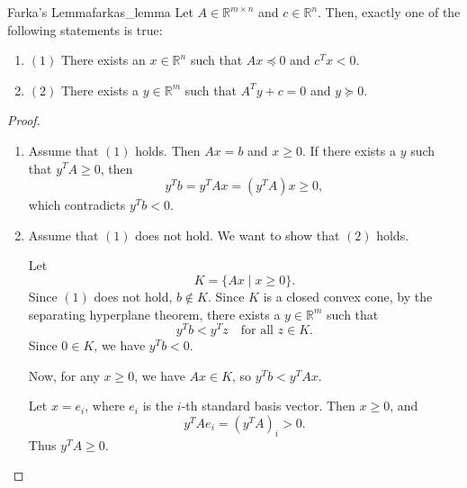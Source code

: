 \begin{lemma}{Farka's Lemma}{farkas_lemma}
	Let \(A \in \mathbb{R}^{m \times n}\) and \(c \in \mathbb{R}^n\). Then, exactly one of the following statements is true:
	\begin{enumerate}
		\item[] \((1)\) There exists an \(x \in \mathbb{R}^n\) such that \(Ax \preceq 0\) and \(c^T x < 0\).
		\item[] \((2)\) There exists a \(y \in \mathbb{R}^m\) such that \(A^T y + c = 0\) and \(y \succeq 0\).
	\end{enumerate}
\end{lemma}

\begin{proof}
	\begin{enumerate}
		\item[] Assume that \((1)\) holds. Then \(Ax = b\) and \(x \ge 0\). If there exists a \(y\) such that \(y^T A \ge 0\), then
		      \[
			      y^T b = y^T Ax = (y^T A)x \ge 0,
		      \]
		      which contradicts \(y^T b < 0\).
		\item[] Assume that \((1)\) does not hold. We want to show that \((2)\) holds.

		      Let
		      \[
			      K = \{Ax \mid x \ge 0\}.
		      \]
		      Since \((1)\) does not hold, \(b \notin K\). Since \(K\) is a closed convex cone, by the separating hyperplane theorem, there exists a \(y \in \mathbb{R}^m\) such that
		      \[
			      y^T b < y^T z \quad \text{for all } z \in K.
		      \]
		      Since \(0 \in K\), we have \(y^T b < 0\).

		      Now, for any \(x \ge 0\), we have \(Ax \in K\), so \(y^T b < y^T Ax\).

		      Let \(x = e_i\), where \(e_i\) is the \(i\)-th standard basis vector. Then \(x \ge 0\), and
		      \[
			      y^T A e_i = (y^T A)_i > 0.
		      \]
		      Thus \(y^T A \ge 0\).
	\end{enumerate}

	\begin{center}
\end{center}
\end{proof}
